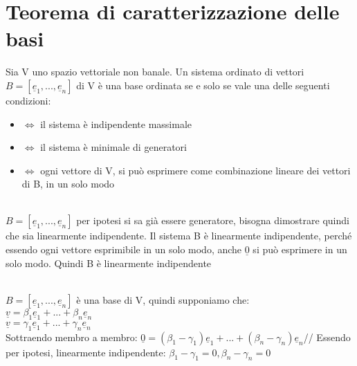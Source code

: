 \section{Teorema di caratterizzazione delle basi}
\begin{teorema}
	Sia V uno spazio vettoriale non banale. Un sistema ordinato di vettori $B=[\underline{e}_1,...,\underline{e}_n]$ di V è una base ordinata se e solo se vale una delle seguenti condizioni:
	\begin{itemize}
		\item $\Longleftrightarrow$ il sistema è indipendente massimale
		\item $\Longleftrightarrow$ il sistema è minimale di generatori
		\item $\Longleftrightarrow$ ogni vettore di V, si può esprimere come combinazione lineare dei vettori di B, in un solo modo
	\end{itemize}
	\begin{dimostrazione}
		\phantom{}\\
		$B=[\underline{e}_1,...,\underline{e}_n]$ per ipotesi si sa già essere generatore, bisogna dimostrare quindi che sia linearmente indipendente. Il sistema B è linearmente indipendente, perché essendo ogni vettore esprimibile in un solo modo, anche $\underline{0}$ si può esprimere in un solo modo. Quindi B è linearmente indipendente
	\end{dimostrazione}
	\begin{dimostrazione}
		\phantom{}\\
		$B=[\underline{e}_1,...,\underline{e}_n]$ è una base di V, quindi supponiamo che:\\
		$\underline{v}=\beta_1 \underline{e}_1+...+\beta_n \underline{e}_n$\\
		$\underline{v}=\gamma_1 \underline{e}_1+...+\gamma_n \underline{e}_n$\\
		Sottraendo membro a membro: $\underline{0}=(\beta_1-\gamma_1)\underline{e}_1+...+(\beta_n-\gamma_n)\underline{e}_n$//
		Essendo per ipotesi, linearmente indipendente: $\beta_1-\gamma_1=0, \beta_n-\gamma_n=0$
	\end{dimostrazione}
\end{teorema}


